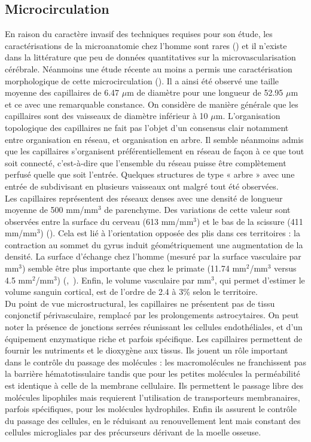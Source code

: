 \subsection{Microcirculation}
\label{sect:microcirculation}
En raison du caractère invasif des techniques requises pour son étude, les caractérisations de la microanatomie chez l’homme sont rares (\cite{Brett2002}) et il n’existe dans la littérature que peu de données quantitatives sur la microvascularisation cérébrale. Néanmoins une étude récente au moins a permis une caractérisation morphologique de cette microcirculation (\cite{Lauwers2008}). Il a ainsi été observé une taille moyenne des capillaires de 6.47 $\mu$m de diamètre pour une longueur de 52.95 $\mu$m et ce avec une remarquable constance. On considère de manière générale que les capillaires sont des vaisseaux de diamètre inférieur à 10 $\mu$m. L’organisation topologique des capillaires ne fait pas l’objet d’un consensus clair notamment entre organisation en réseau, et organisation en arbre. Il semble néanmoins admis que les capillaires s’organisent préférentiellement en réseau de façon à ce que tout soit connecté, c’est-à-dire que l’ensemble du réseau puisse être complètement perfusé quelle que soit l’entrée. Quelques structures de type « arbre » avec une entrée de subdivisant en plusieurs vaisseaux ont malgré tout été observées.\\
Les capillaires représentent des réseaux denses avec une densité de longueur moyenne de 500 mm/mm$^3$ de parenchyme. Des variations de cette valeur sont observées entre la surface du cerveau (613 mm/mm$^3$) et le bas de la scissure (411 mm/mm$^3$)  (\cite{Lauwers2008}). Cela est lié à l’orientation opposée des plis dans ces territoires : la contraction au sommet du gyrus induit géométriquement une augmentation de la densité. La surface d’échange chez l’homme (mesuré par la surface vasculaire par mm$^3$) semble être plus importante que chez le primate (11.74 mm$^2$/mm$^3$ versus 4.5 mm$^2$/mm$^3$) (\cite{Lauwers2008},~\cite{Risser2007}). Enfin, le volume vasculaire par mm$^3$, qui permet d’estimer le volume sanguin cortical, est de l’ordre de 2.4 à 3\% selon le territoire.\\
Du point de vue microstructural, les capillaires ne présentent pas de tissu conjonctif périvasculaire, remplacé par les prolongements astrocytaires. On peut noter la présence de jonctions serrées réunissant les cellules endothéliales, et d’un équipement enzymatique riche et parfois spécifique. Les capillaires permettent de fournir les nutriments et le dioxygène aux tissus. Ils jouent un rôle important dans le contrôle du passage des molécules : les macromolécules ne franchissent pas la barrière hématotissulaire tandis que pour les petites molécules la perméabilité est identique à celle de la membrane cellulaire. Ils permettent le passage libre des molécules lipophiles mais requierent l’utilisation de transporteurs membranaires, parfois spécifiques, pour les molécules hydrophiles. Enfin ils assurent le contrôle du passage des cellules, en le réduisant au renouvellement lent mais constant des cellules microgliales par des précurseurs dérivant de la moelle osseuse.\\
